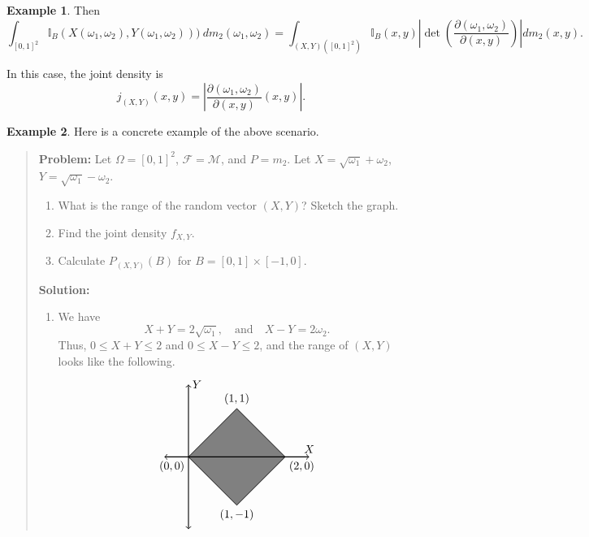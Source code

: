 \documentclass[a4paper,12pt]{scrreprt}
\newcommand{\pder}[2]{\frac{\partial #1}{\partial #2}}
\theoremstyle{definition}
\newtheorem{example}{Example}[section]
\theoremstyle{plain}
\theoremstyle{remark}
\begin{document}
\begin{example}
  Then
  \begin{equation*}
    \int_{{[0, 1]}^{2}} \mathbb{I}_{B}(X(\omega_{1}, \omega_{2}), Y(\omega_{1},\omega_{2})))\ dm_{2}(\omega_{1}, \omega_{2}) = \int_{(X, Y)({[0, 1]}^{2})} \mathbb{I}_{B}(x, y) \left| \det\left( \pder{(\omega_{1}, \omega_{2})}{(x, y)} \right) \right|dm_{2}(x, y).
  \end{equation*}

  In this case, the joint density is
  \begin{equation*}
    j_{(X, Y)}(x, y) = \left| \pder{(\omega_{1}, \omega_{2})}{(x, y)}(x, y) \right|.
  \end{equation*}
\end{example}

\begin{example}
  Here is a concrete example of the above scenario.

  \begin{quote}
    \textbf{Problem:} Let $\Omega = {[0, 1]}^{2}$, $\mathcal{F} = \mathcal{M}$, and $P = m_{2}$. Let $X = \sqrt{\omega_{1}} + \omega_{2}$, $Y = \sqrt{\omega_{1}} - \omega_{2}$.
    \begin{enumerate}
      \item What is the range of the random vector $(X, Y)$? Sketch the graph.

      \item Find the joint density $f_{X, Y}$.

      \item Calculate $P_{(X, Y)}(B)$ for $B = [0, 1] \times [-1, 0]$.
    \end{enumerate}

    \textbf{Solution:}

    \begin{enumerate}
      \item We have
        \begin{equation*}
          X + Y = 2\sqrt{\omega_{1}},\quad \text{and}\quad X - Y = 2\omega_{2}.
        \end{equation*}
        Thus, $0 \leq X + Y \leq 2$ and $0 \leq X - Y \leq 2$, and the range of $(X, Y)$ looks like the following.
        \begin{equation*}
          \begin{tikzpicture}[scale=1.5]
            \draw[fill=gray] (0, 0) -- (1, 1) -- (2, 0) -- (1, -1) -- (0,0);
            \draw [thick, <->] (-0.5, 0) -- (2.5, 0){};
            \draw [thick, <->] (0, -1.5) -- (0, 1.5);
            \draw (0, 0) -- (1, 1) -- (2, 0) -- (1, -1) -- (0,0);
            \node[above] at (2.5, 0) {$X$};
            \node[right] at (0, 1.5) {$Y$};
            \node[below left] at (0, 0) {$(0, 0)$};
            \node[below right] at (2, 0) {$(2, 0)$};
            \node[above] at (1, 1) {$(1, 1)$};
            \node[below] at (1, -1) {$(1, -1)$};
          \end{tikzpicture}
        \end{equation*}


\end{enumerate}
\end{quote}
\end{example}
\end{document}

